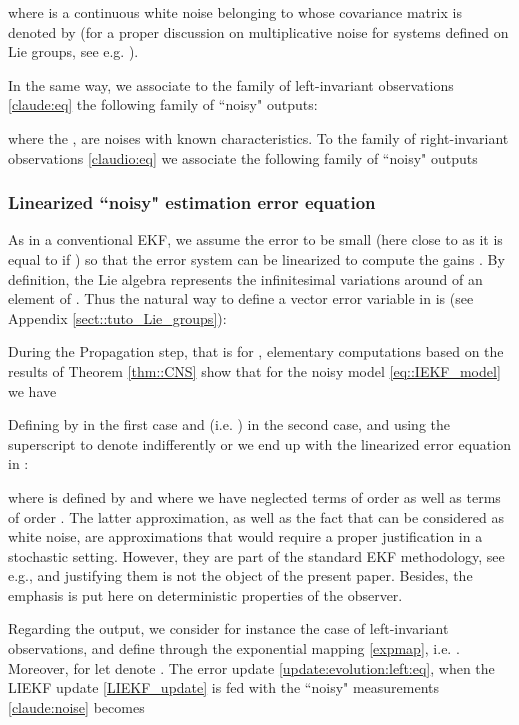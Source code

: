 \documentclass[a4paper,12pt,onecolumn]{article}
\begin{document}
 where
  is a continuous white noise belonging to  whose covariance matrix is denoted by  (for a proper discussion on multiplicative noise for systems defined on Lie groups, see e.g. \cite{barrau2013intrinsic}). 



In the same way, we associate to the family of left-invariant observations \eqref{claude:eq} the following family of ``noisy" outputs:

where the ,  are noises with known characteristics.  To the family of right-invariant observations \eqref{claudio:eq} we associate the following family of ``noisy" outputs






\subsubsection{Linearized ``noisy" estimation error equation}
As in a conventional EKF, we assume the error to be small (here close to  as it is equal to  if ) so that the error system can be linearized to compute the gains . By definition, the Lie algebra  represents the infinitesimal variations around  of an element of . Thus the natural way to define a vector error variable  in  is (see Appendix \ref{sect::tuto_Lie_groups}):











During the Propagation step, that is for , elementary computations based on the results of Theorem \ref{thm::CNS} show that for the noisy model \eqref{eq::IEKF_model} we have

Defining  by  in the first case and  (i.e. ) in the second case, and using the superscript  to denote indifferently  or  we end up with the linearized error equation in : 

where  is defined by   and where we have neglected terms of order  as well as terms of order . The latter approximation, as well as the fact that  can be considered as white noise, are approximations that would require a proper justification in a stochastic setting. However,   they are part of the standard EKF methodology, see e.g.,  \cite{lefferts1982kalman} and justifying them is not the object of the present paper. Besides,   the emphasis is put here on   deterministic properties of the observer. 


Regarding the output,  we consider for instance the case of left-invariant observations, and define 
 through the exponential mapping \eqref{expmap}, i.e. . Moreover, for  let  denote  . 
The error update  \eqref{update:evolution:left:eq}, when the LIEKF update \eqref{LIEKF_update} is fed with the ``noisy" measurements  \eqref{claude:noise} becomes
\end{document}
